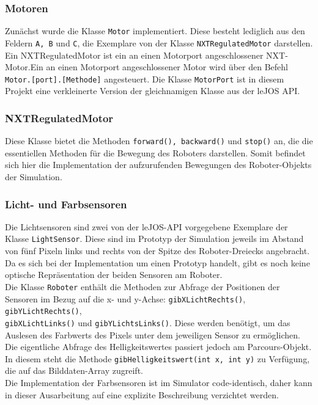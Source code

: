 \documentclass[paper=a4, pagesize, DIV=calc, BCOR=12.5mm, twoside=on, onecolumn=on, open = any, titlepage =on, parskip =half-, headsepline = on, footsepline = on, chapterprefix = on, appendixprefix = off, fontsize = 12pt, numbers = noenddot, abstract = on]{scrbook}
\numberwithin{equation}{chapter}
\theoremstyle{definition}
\theoremstyle{plain}
\theoremstyle{plain}
\theoremstyle{remark}
\theoremstyle{plain}
\theoremstyle{plain}
\begin{document}
\subsubsection{Motoren}
Zunächst wurde die Klasse \texttt{Motor} implementiert. Diese besteht lediglich aus den Feldern \texttt{A, B} und \texttt{C}, die Exemplare von der Klasse \texttt{NXTRegulatedMotor} darstellen. Ein NXTRegulatedMotor ist ein an einen Motorport angeschlossener NXT-Motor.Ein an einen Motorport angeschlossener Motor wird über den Befehl \texttt{Motor.[port].[Methode]} angesteuert. Die Klasse \texttt{MotorPort} ist in diesem Projekt eine verkleinerte Version der gleichnamigen Klasse aus der leJOS API. 

\subsubsection{NXTRegulatedMotor}
Diese Klasse bietet die Methoden \texttt{forward(), backward()} und \texttt{stop()} an, die die essentiellen Methoden für die Bewegung des Roboters darstellen. Somit befindet sich hier die Implementation der aufzurufenden Bewegungen des Roboter-Objekts der Simulation.

\subsubsection{Licht- und Farbsensoren}
Die Lichtsensoren sind zwei von der leJOS-API vorgegebene Exemplare der Klasse \texttt{LightSensor}. Diese sind im Prototyp der Simulation jeweils im Abstand von fünf Pixeln links und rechts von der Spitze des Roboter-Dreiecks angebracht. Da es sich bei der Implementation um einen Prototyp handelt, gibt es noch keine optische Repräsentation der beiden Sensoren am Roboter.\\

Die Klasse \texttt{Roboter} enthält die Methoden zur Abfrage der Positionen der Sensoren im Bezug auf die x- und y-Achse: \texttt{gibXLichtRechts()}, \texttt{gibYLichtRechts()},\\
\texttt{gibXLichtLinks()} und \texttt{gibYLichtsLinks()}. Diese werden benötigt, um das Auslesen des Farbwerts des Pixels unter dem jeweiligen Sensor zu ermöglichen. Die eigentliche Abfrage des Helligkeitswertes passiert jedoch am Parcours-Objekt. In diesem steht die Methode \texttt{gibHelligkeitswert(int x, int y)} zu Verfügung, die auf das Bilddaten-Array zugreift.\\

Die Implementation der Farbsensoren ist im Simulator code-identisch, daher kann in dieser Ausarbeitung auf eine explizite Beschreibung verzichtet werden.
\end{document}
